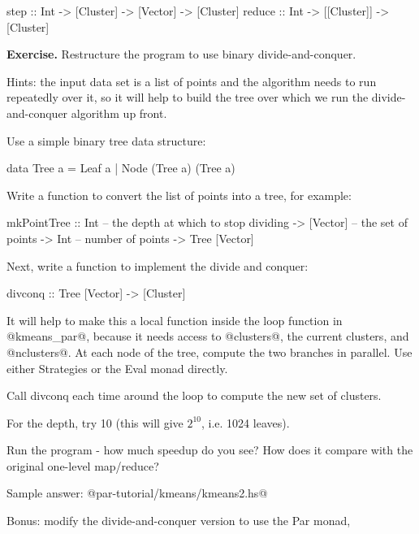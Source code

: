 \documentclass[11pt,a4paper]{article}
\begin{document}
\begin{haskell}
  step   :: Int -> [Cluster] -> [Vector] -> [Cluster]
  reduce :: Int -> [[Cluster]] -> [Cluster]
\end{haskell}

\noindent \textbf{Exercise.} Restructure the program to use binary divide-and-conquer.

Hints: the input data set is a list of points and the algorithm
needs to run repeatedly over it, so it will help to build the tree
over which we run the divide-and-conquer algorithm up front.

Use a simple binary tree data structure:

\begin{haskell}
data Tree a = Leaf a
            | Node (Tree a) (Tree a)
\end{haskell}

Write a function to convert the list of points into a tree, for
example:

\begin{haskell}
mkPointTree
   :: Int            -- the depth at which to stop dividing
   -> [Vector]       -- the set of points
   -> Int            -- number of points
   -> Tree [Vector]
\end{haskell}

Next, write a function to implement the divide and conquer:

\begin{haskell}
divconq :: Tree [Vector] -> [Cluster]
\end{haskell}

It will help to make this a local function inside the loop function in
@kmeans_par@, because it needs access to @clusters@, the current
clusters, and @nclusters@.  At each node of the tree, compute the two
branches in parallel.  Use either Strategies or the Eval monad
directly.

Call divconq each time around the loop to compute the new set of
clusters.

For the depth, try 10 (this will give $2^10$, i.e. 1024 leaves).

Run the program - how much speedup do you see?  How does it compare
with the original one-level map/reduce?

Sample answer: @par-tutorial/kmeans/kmeans2.hs@

Bonus: modify the divide-and-conquer version to use the Par monad,
\end{document}
